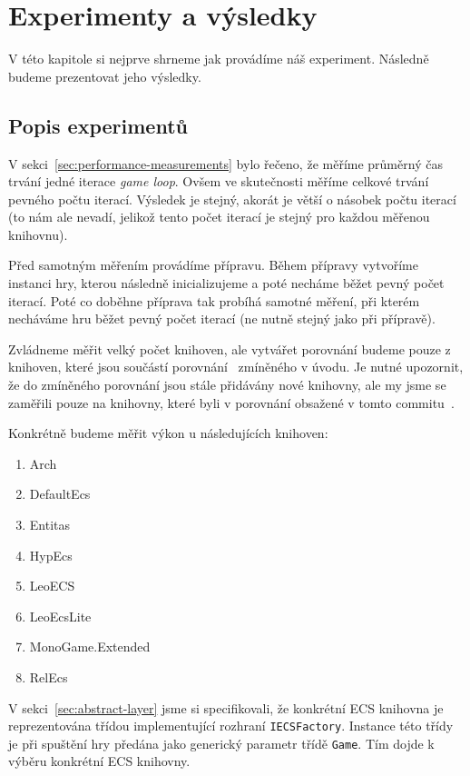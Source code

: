 \chapter{Experimenty a výsledky}
V této kapitole si nejprve shrneme jak provádíme náš experiment. Následně budeme prezentovat jeho výsledky.

\section{Popis experimentů}
V sekci~\ref{sec:performance-measurements} bylo řečeno, že měříme průměrný čas trvání jedné iterace \textit{game loop}. Ovšem ve skutečnosti měříme celkové trvání pevného počtu iterací. Výsledek je stejný, akorát je větší o násobek počtu iterací (to nám ale nevadí, jelikož tento počet iterací je stejný pro každou měřenou knihovnu).

Před samotným měřením provádíme přípravu. Během přípravy vytvoříme instanci hry, kterou následně inicializujeme a poté necháme běžet pevný počet iterací. Poté co doběhne příprava tak probíhá samotné měření, při kterém  necháváme hru běžet pevný počet iterací (ne nutně stejný jako při přípravě).

Zvládneme měřit velký počet knihoven, ale vytvářet porovnání budeme pouze z knihoven, které jsou součástí porovnání~\cite{EcsCsharpBenchmark} zmíněného v úvodu. Je nutné upozornit, že do zmíněného porovnání jsou stále přidávány nové knihovny, ale my jsme se zaměřili pouze na knihovny, které byli v porovnání obsažené v tomto commitu~\cite{EcsCsharpBenchmarkCommit}.


Konkrétně budeme měřit výkon u následujících knihoven:

\begin{enumerate}
    \item Arch~\cite{Arch}
    \item DefaultEcs~\cite{DefaultEcs}
    \item Entitas~\cite{Entitas}
    \item HypEcs~\cite{HypEcs}
    \item LeoECS~\cite{LeoECS}
    \item LeoEcsLite~\cite{LeoEcsLite}
    \item MonoGame.Extended~\cite{MonoGameExtended}
    \item RelEcs~\cite{RelEcs}
\end{enumerate}

V sekci~\ref{sec:abstract-layer} jsme si specifikovali, že konkrétní ECS knihovna je reprezentována třídou implementující rozhraní \texttt{IECSFactory}. Instance této třídy je při spuštění hry předána jako generický parametr třídě \texttt{Game}. Tím dojde k výběru konkrétní ECS knihovny.

